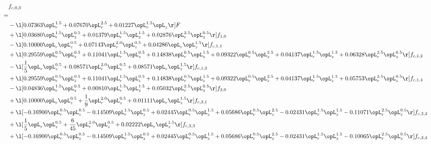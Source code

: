 \begin{alignat}{2} 
\label{eq:f_03_1} 
& f_{c,0,3} \nonumber \\ 
 = \\ 
& - \l[  0.07363 \opL_r^{1.5} +  0.07670 \opL_r^{2.5} +  0.01227 \opL_r^{1.5} \opL_z  \r] F \nonumber \\ 
& + \l[  0.03680 \opL_r^{1.5} \opL_z^{0.5} +  0.01379 \opL_r^{1.5} \opL_z^{1.5} +  0.02876 \opL_r^{2.5} \opL_z^{0.5}  \r] f_{1,0} \nonumber \\ 
& - \l[  0.10000 \opL_r \opL_z^{0.5} +  0.07143 \opL_r^{2.0} \opL_z^{0.5} +  0.04286 \opL_r \opL_z^{1.5}  \r] f_{c,1,1} \nonumber \\ 
& + \l[  0.29559 \opL_r^{0.5} \opL_z^{0.5} +  0.11041 \opL_r^{1.5} \opL_z^{0.5} +  0.14838 \opL_r^{0.5} \opL_z^{1.5} +  0.09322 \opL_r^{0.5} \opL_z^{2.5} +  0.04137 \opL_r^{1.5} \opL_z^{1.5} +  0.06328 \opL_r^{2.5} \opL_z^{0.5}  \r] f_{c,1,2} \nonumber \\ 
& - \l[ \frac{1}{5} \opL_r \opL_z^{0.5} +  0.08571 \opL_r^{2.0} \opL_z^{0.5} +  0.08571 \opL_r \opL_z^{1.5}  \r] f_{c,1,3} \nonumber \\ 
& + \l[  0.29559 \opL_r^{0.5} \opL_z^{0.5} +  0.11041 \opL_r^{1.5} \opL_z^{0.5} +  0.14838 \opL_r^{0.5} \opL_z^{1.5} +  0.09322 \opL_r^{0.5} \opL_z^{2.5} +  0.04137 \opL_r^{1.5} \opL_z^{1.5} +  0.05753 \opL_r^{2.5} \opL_z^{0.5}  \r] f_{c,1,4} \nonumber \\ 
& - \l[  0.04836 \opL_r^{1.5} \opL_z^{0.5} +  0.00810 \opL_r^{1.5} \opL_z^{1.5} +  0.05032 \opL_r^{2.5} \opL_z^{0.5}  \r] f_{3,0} \nonumber \\ 
& + \l[  0.10000 \opL_r \opL_z^{0.5} + \frac{1}{9} \opL_r^{2.0} \opL_z^{0.5} +  0.01111 \opL_r \opL_z^{1.5}  \r] f_{c,3,1} \nonumber \\ 
& + \l[  -0.16900 \opL_r^{0.5} \opL_z^{0.5}   -0.14509 \opL_r^{1.5} \opL_z^{0.5} +  0.02445 \opL_r^{0.5} \opL_z^{1.5} +  0.05686 \opL_r^{0.5} \opL_z^{2.5}   -0.02431 \opL_r^{1.5} \opL_z^{1.5}   -0.11071 \opL_r^{2.5} \opL_z^{0.5}  \r] f_{c,3,2} \nonumber \\ 
& + \l[ \frac{1}{5} \opL_r \opL_z^{0.5} + \frac{6}{45} \opL_r^{2.0} \opL_z^{0.5} +  0.02222 \opL_r \opL_z^{1.5}  \r] f_{c,3,3} \nonumber \\ 
& + \l[  -0.16900 \opL_r^{0.5} \opL_z^{0.5}   -0.14509 \opL_r^{1.5} \opL_z^{0.5} +  0.02445 \opL_r^{0.5} \opL_z^{1.5} +  0.05686 \opL_r^{0.5} \opL_z^{2.5}   -0.02431 \opL_r^{1.5} \opL_z^{1.5}   -0.10065 \opL_r^{2.5} \opL_z^{0.5}  \r] f_{c,3,4} \nonumber \\ 

\end{alignat}
